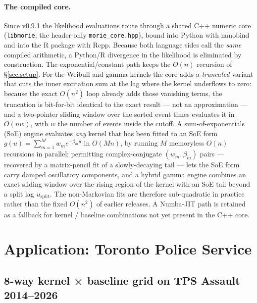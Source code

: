 \documentclass[article,shortnames,nojss]{jss}
\newcommand{\1}{\mathbbm{1}}
\theoremstyle{plain}
\theoremstyle{definition}
\begin{document}
\paragraph{The compiled core.}
Since v0.9.1 the likelihood evaluations route through a shared C++
numeric core (\texttt{libmorie}; the header-only
\texttt{morie\_core.hpp}), bound into Python with nanobind and into
the R package with Rcpp. Because both language sides call the
\emph{same} compiled arithmetic, a Python/R divergence in the
likelihood is eliminated by construction. The exponential/constant
path keeps the $O(n)$ recursion of \S\ref{sec:setup}. For the Weibull
and gamma kernels the core adds a \emph{truncated} variant that cuts
the inner excitation sum at the lag where the kernel underflows to
zero: because the exact $O(n^2)$ loop already adds those vanishing
terms, the truncation is bit-for-bit identical to the exact result
--- not an approximation --- and a two-pointer sliding window over the
sorted event times evaluates it in $O(nw)$, with $w$ the number of
events inside the cutoff. A sum-of-exponentials (SoE) engine evaluates
\emph{any} kernel that has been fitted to an SoE form
$g(u)=\sum_{m=1}^M w_m e^{-\beta_m u}$ in $O(Mn)$, by running $M$
memoryless $O(n)$ recursions in parallel; permitting complex-conjugate
$(w_m,\beta_m)$ pairs --- recovered by a matrix-pencil fit of a
slowly-decaying tail --- lets the SoE form carry damped oscillatory
components, and a hybrid gamma engine combines an exact sliding window
over the rising region of the kernel with an SoE tail beyond a split
lag $u_{\mathrm{split}}$. The non-Markovian fits are therefore
sub-quadratic in practice rather than the fixed $O(n^2)$ of earlier
releases. A Numba-JIT path is retained as a fallback for kernel /
baseline combinations not yet present in the C++ core.

\section{Application: Toronto Police Service}\label{sec:application}

\subsection{8-way kernel × baseline grid on TPS Assault 2014--2026}\label{sec:application-8way}
\end{document}
